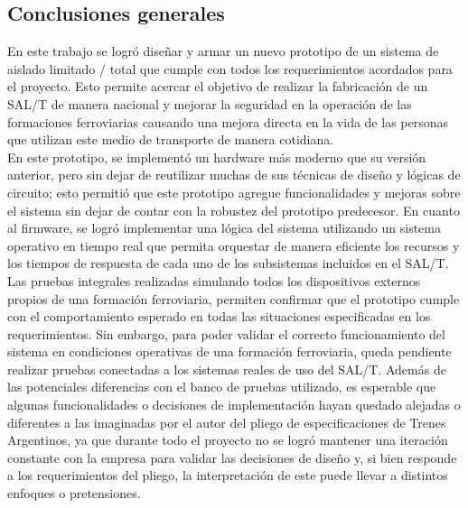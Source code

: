 \subsection{Conclusiones generales}

En este trabajo se logró diseñar y armar un nuevo prototipo de un sistema de aislado limitado / total que cumple con todos los requerimientos acordados para el proyecto. Esto permite acercar el objetivo de realizar la fabricación de un SAL/T de manera nacional y mejorar la seguridad en la operación de las formaciones ferroviarias causando una mejora directa en la vida de las personas que utilizan este medio de transporte de manera cotidiana. \\

En este prototipo, se implementó un hardware más moderno que su versión anterior, pero sin dejar de reutilizar muchas de sus técnicas de diseño y lógicas de circuito; esto permitió que este prototipo agregue funcionalidades y mejoras sobre el sistema sin dejar de contar con la robustez del prototipo predecesor. En cuanto al firmware, se logró implementar una lógica del sistema utilizando un sistema operativo en tiempo real que permita orquestar de manera eficiente los recursos y los tiempos de respuesta de cada uno de los subsistemas incluidos en el SAL/T. \\ 

Las pruebas integrales realizadas simulando todos los dispositivos externos propios de una formación ferroviaria, permiten confirmar que el prototipo cumple con el comportamiento esperado en todas las situaciones especificadas en los requerimientos. Sin embargo, para poder validar el correcto funcionamiento del sistema en condiciones operativas de una formación ferroviaria, queda pendiente realizar pruebas conectadas a los sistemas reales de uso del SAL/T. Además de las potenciales diferencias con el banco de pruebas utilizado, es esperable que algunas funcionalidades o decisiones de implementación hayan quedado alejadas o diferentes a las imaginadas por el autor del pliego de especificaciones de Trenes Argentinos, ya que durante todo el proyecto no se logró mantener una iteración constante con la empresa para validar las decisiones de diseño y, si bien responde a los requerimientos del pliego, la interpretación de este puede llevar a distintos enfoques o pretensiones. \\ 

